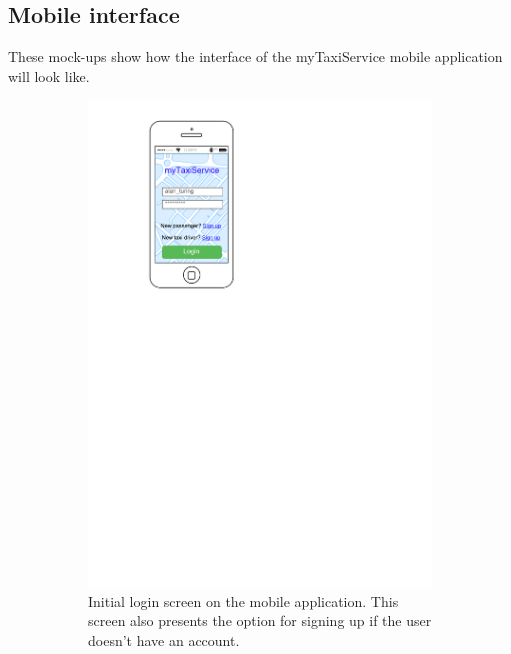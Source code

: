 \FloatBarrier
\subsection{Mobile interface}
These mock-ups show how the interface of the myTaxiService mobile application will look like.

\begin{figure}[h]
    \centering
    \begin{subfigure}{0.45\textwidth}
        \centering
        \includegraphics[width=\textwidth]{mockup/app/MobileLogin}
        \caption{Initial login screen on the mobile application. This screen also presents the option for signing up if the user doesn't have an account.}
        \label{fig:mockup-login-mobile}
    \end{subfigure}
    \hspace{1cm}
    \begin{subfigure}{0.45\textwidth}

\end{subfigure}
\end{figure}
